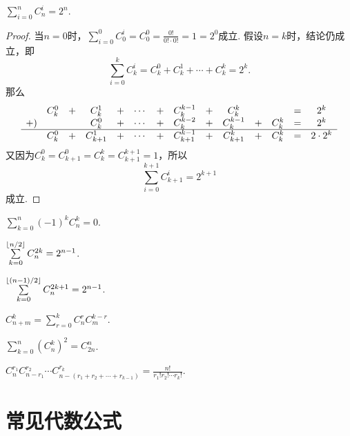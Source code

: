 \begin{property}\label{theorem:组合数性质3}
\(\sum\limits_{i=0}^n C_n^i = 2^n\).
\begin{proof}
当\(n=0\)时，\(\sum\limits_{i=0}^0 C_0^i = C_0^0 = \frac{0!}{0! \cdot 0!} = 1 = 2^0\)成立.
假设\(n=k\)时，结论仍成立，即\[
\sum\limits_{i=0}^k C_k^i
= C_k^0 + C_k^1 + \dotsb + C_k^k = 2^k.
\]那么\[
\begin{array}{*{14}{c}}
& C_k^0 &+& C_k^1 &+& \dotsb &+& C_k^{k-1} &+& C_k^k && &=& 2^k \\
+) & && C_k^0 &+& \dotsb &+& C_k^{k-2} &+& C_k^{k-1} &+& C_k^k &=& 2^k \\ \hline
& C_k^0 &+& C_{k+1}^1 &+& \dotsb &+& C_{k+1}^{k-1} &+& C_{k+1}^k &+& C_k^k &=& 2 \cdot 2^k
\end{array}
\]又因为\(C_k^0 = C_{k+1}^0 = C_k^k = C_{k+1}^{k+1} = 1\)，所以\[
\sum\limits_{i=0}^{k+1} C_{k+1}^i = 2^{k+1}
\]成立.
\end{proof}
\end{property}

\begin{property}\label{theorem:组合数性质4}
\(\sum\limits_{k=0}^n (-1)^k C_n^k = 0\).
\end{property}

\begin{property}\label{theorem:组合数性质5}
\(\sum\limits_{k=0}^{\lfloor n/2\rfloor} C_n^{2k} = 2^{n-1}\).
\end{property}
\begin{property}\label{theorem:组合数性质6}
\(\sum\limits_{k=0}^{\lfloor(n-1)/2\rfloor} C_n^{2k+1} = 2^{n-1}\).
\end{property}

\begin{property}\label{theorem:组合数性质7}
\(C_{n+m}^k = \sum\limits_{r=0}^{k} C_n^r C_m^{k-r}\).
\end{property}

\begin{property}\label{theorem:组合数性质8}
\(\sum\limits_{k=0}^n (C_n^k)^2 = C_{2n}^n\).
\end{property}

\begin{property}\label{theorem:组合数性质9}
\(C_n^{r_1} C_{n-r_1}^{r_2} \dotsm C_{n-(r_1+r_2+\dotsb+r_{k-1})}^{r_k}
= \frac{n!}{r_1! r_2! \dotsm r_k!}\).
\end{property}

\section{常见代数公式}

